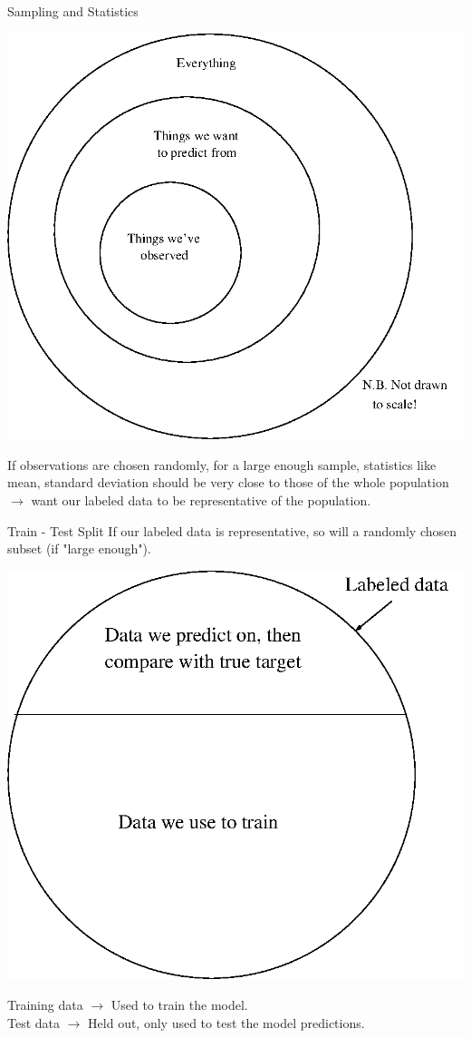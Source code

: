 \documentclass[12pt,t]{beamer}
\begin{document}
\begin{frame}{Sampling and Statistics} 
\centerline{
\includegraphics[height=0.4\textheight]{images/populations.png}
}
If observations are chosen randomly, for a large enough sample, statistics like mean, standard deviation should be very close to those of the whole population $\longrightarrow$ want our labeled data to be representative of the population.
\end{frame}

\begin{frame}{Train - Test Split} 
If our labeled data is representative, so will a randomly chosen subset (if "large enough").
\centerline{
\includegraphics[height=0.5\textheight]{images/train_test.png}
}
\noindent
Training data $\longrightarrow$ Used to train the model. \\
Test data $\longrightarrow$ Held out, only used to test the model predictions.
\end{frame}
\end{document}
